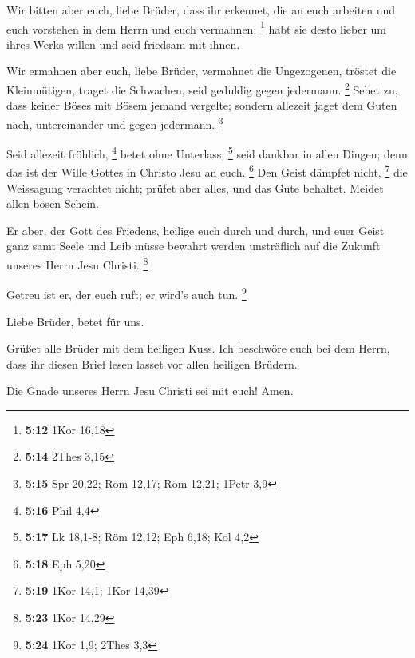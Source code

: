  Wir bitten aber euch, liebe Brüder, dass ihr erkennet, die
an euch arbeiten und euch vorstehen in dem Herrn und euch vermahnen;
\footnote{\textbf{5:12} 1Kor 16,18}  habt sie desto lieber
um ihres Werks willen und seid friedsam mit ihnen.

 Wir ermahnen aber euch, liebe Brüder, vermahnet die
Ungezogenen, tröstet die Kleinmütigen, traget die Schwachen, seid
geduldig gegen jedermann. \footnote{\textbf{5:14} 2Thes 3,15}
 Sehet zu, dass keiner Böses mit Bösem jemand vergelte;
sondern allezeit jaget dem Guten nach, untereinander und gegen
jedermann. \footnote{\textbf{5:15} Spr 20,22; Röm 12,17; Röm 12,21;
  1Petr 3,9}

 Seid allezeit fröhlich, \footnote{\textbf{5:16} Phil 4,4}
 betet ohne Unterlass, \footnote{\textbf{5:17} Lk 18,1-8;
  Röm 12,12; Eph 6,18; Kol 4,2}  seid dankbar in allen
Dingen; denn das ist der Wille Gottes in Christo Jesu an euch.
\footnote{\textbf{5:18} Eph 5,20}  Den Geist dämpfet nicht,
\footnote{\textbf{5:19} 1Kor 14,1; 1Kor 14,39}  die
Weissagung verachtet nicht;  prüfet aber alles, und das
Gute behaltet.  Meidet allen bösen Schein.

 Er aber, der Gott des Friedens, heilige euch durch und
durch, und euer Geist ganz samt Seele und Leib müsse bewahrt werden
unsträflich auf die Zukunft unseres Herrn Jesu Christi. \footnote{\textbf{5:23}
  1Kor 14,29}

 Getreu ist er, der euch ruft; er wird's auch tun.
\footnote{\textbf{5:24} 1Kor 1,9; 2Thes 3,3}

 Liebe Brüder, betet für uns.

 Grüßet alle Brüder mit dem heiligen Kuss. 
Ich beschwöre euch bei dem Herrn, dass ihr diesen Brief lesen lasset vor
allen heiligen Brüdern.

 Die Gnade unseres Herrn Jesu Christi sei mit euch! Amen.

